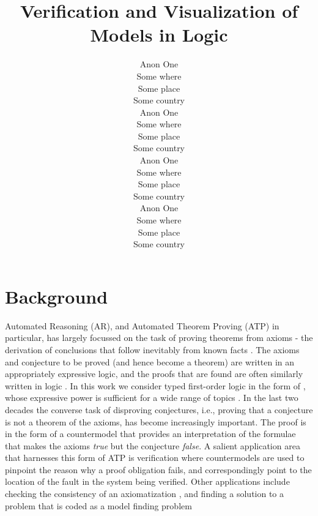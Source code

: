 \documentclass[letterpaper]{article}
\begin{document}

\title{Verification and Visualization of Models in Logic}
\author{Anon One\\
Some where\\
Some place\\
Some country\\
\And
Anon One\\
Some where\\
Some place\\
Some country\\
\And
Anon One\\
Some where\\
Some place\\
Some country\\
\And
Anon One\\
Some where\\
Some place\\
Some country}

\maketitle
\begin{abstract}
\begin{quote}
\end{quote}
\end{abstract}
\section{Background}

Automated Reasoning (AR), and Automated Theorem Proving (ATP) in particular, has largely focussed
on the task of proving theorems from axioms - the derivation of conclusions that follow inevitably 
from known facts \cite{RV01-HAR}.
The axioms and conjecture to be proved (and hence become a theorem) are written in an 
appropriately expressive logic, and the proofs that are found are often similarly written in
logic \cite{SS+06}.
In this work we consider typed first-order logic in the form of \cite{Wal83,Sch85,Coh87},
whose expressive power is sufficient for a wide range of topics \cite{Sut17}.
In the last two decades the converse task of disproving conjectures, i.e., proving that a 
conjecture is not a theorem of the axioms, has become increasingly important.
The proof is in the form of a countermodel that provides an interpretation of the formulae that 
makes the axioms {\em true} but the conjecture {\em false}.
A salient application area that harnesses this form of ATP is verification \cite{DKW08}
where countermodels are used to pinpoint the reason why a proof obligation fails, and
correspondingly point to the location of the fault in the system being verified.
Other applications include checking the consistency of an axiomatization \cite{SS+17}, and
finding a solution to a problem that is coded as a model finding problem \cite{Win82}
\end{document}

